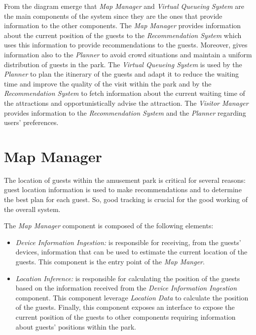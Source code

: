 From the diagram emerge that \textit{Map Manager} and \textit{Virtual Queueing System} are the main components of the system since they are the ones
that provide information to the other components. The \textit{Map Manager} provides information about the current position of the guests to the
\textit{Recommendation System} which uses this information to provide recommendations to the guests. Moreover, gives information also to the
\textit{Planner} to avoid crowd situations and maintain a uniform distribution of guests in the park. The \textit{Virtual Queueing System} is used by
the \textit{Planner} to plan the itinerary of the guests and adapt it to reduce the waiting time and improve the quality of the visit within the park
and by the \textit{Recommendation System} to fetch information about the current waiting time of the attractions and opportunistically advise the
attraction. The \textit{Visitor Manager} provides information to the \textit{Recommendation System} and the \textit{Planner} regarding users'
preferences.

\section{Map Manager}

The location of guests within the amusement park is critical for several reasons: guest location information is used to make recommendations and to
determine the best plan for each guest. So, good tracking is crucial for the good working of the overall system.

The \textit{Map Manager} component is composed of the following elements:
\begin{itemize}
	\item \textit{Device Information Ingestion:} is responsible for receiving, from the guests' devices, information that can be used to estimate the
	      current location of the guests. This component is the entry point of the \textit{Map Manger}.
	\item \textit{Location Inference:} is responsible for calculating the position of the guests based on the information received from the
	      \textit{Device Information Ingestion} component. This component leverage \textit{Location Data} to calculate the position of the guests.
	      Finally, this component exposes an interface to expose the current position of the guests to other components requiring information about
	      guests' positions within the park.
\end{itemize}

